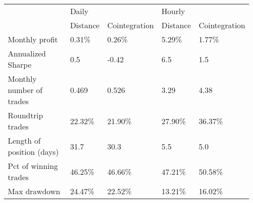 \begin{tabular}{lllll}
\toprule
{} & \multicolumn{2}{l}{Daily} & \multicolumn{2}{l}{Hourly} \\
{} & Distance & Cointegration & Distance & Cointegration \\
\midrule
Monthly profit            &   0.31\% &        0.26\% &   5.29\% &        1.77\% \\
Annualized Sharpe         &      0.5 &         -0.42 &      6.5 &           1.5 \\
Monthly number of trades  &    0.469 &         0.526 &     3.29 &          4.38 \\
Roundtrip trades          &  22.32\% &       21.90\% &  27.90\% &       36.37\% \\
Length of position (days) &     31.7 &          30.3 &      5.5 &           5.0 \\
Pct of winning trades     &  46.25\% &       46.66\% &  47.21\% &       50.58\% \\
Max drawdown              &  24.47\% &       22.52\% &  13.21\% &       16.02\% \\
\bottomrule
\end{tabular}
